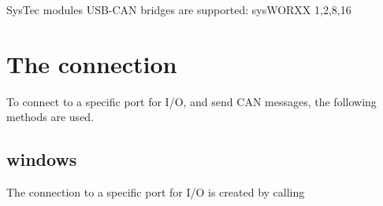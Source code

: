 \documentclass[letterpaper,10pt,english]{sphinxmanual}
\begin{document}
SysTec modules USB-CAN bridges are supported: sysWORXX 1,2,8,16


\section{The connection}
\label{\detokenize{vendors/systec:the-connection}}
To connect to a specific port for I/O, and send CAN messages, the following methods are used.


\subsection{windows}
\label{\detokenize{vendors/systec:windows}}
The connection to a specific port for I/O is created by calling
\end{document}
